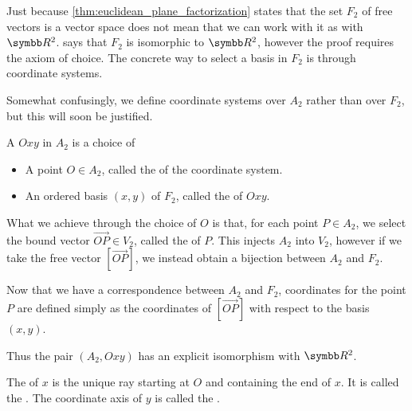 \begin{definition}\label{def:affine_plane_coordinate_system}
  Just because \cref{thm:euclidean_plane_factorization} states that the set \( F_2 \) of free vectors is a vector space does not mean that we can work with it as with \( \R^2 \).  says that \( F_2 \) is isomorphic to \( \R^2 \), however the proof requires the axiom of choice. The concrete way to select a basis in \( F_2 \) is through coordinate systems.

  Somewhat confusingly, we define coordinate systems over \( A_2 \) rather than over \( F_2 \), but this will soon be justified.

  A  \( Oxy \) in \( A_2 \) is a choice of
  \begin{itemize}
    \item A point \( O \in A_2 \), called the  of the coordinate system.
    \item An ordered basis \( (x, y) \) of \( F_2 \), called the  of \( Oxy \).
  \end{itemize}

  What we achieve through the choice of \( O \) is that, for each point \( P \in A_2 \), we select the bound vector \( \Vec{OP} \in V_2 \), called the  of \( P \). This injects \( A_2 \) into \( V_2 \), however if we take the free vector \( [\Vec{OP}] \), we instead obtain a bijection between \( A_2 \) and \( F_2 \).

  Now that we have a correspondence between \( A_2 \) and \( F_2 \), coordinates for the point \( P \) are defined simply as the coordinates of \( [\Vec{OP}] \) with respect to the basis \( (x, y) \).

  Thus the pair \( (A_2, Oxy) \) has an explicit isomorphism with \( \R^2 \).

  The  of \( x \) is the unique ray starting at \( O \) and containing the end of \( x \). It is called the . The coordinate axis of \( y \) is called the .
\end{definition}

